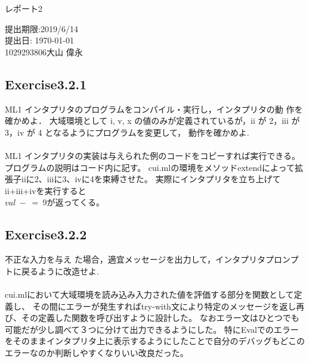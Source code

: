 \documentclass[a4paper,11pt,oneside,openany]{jsarticle}
\begin{document}
    \begin{center}
    
      \vspace*{35mm}
      \huge レポート2 \par
      \vspace{90mm}
      \Large 提出期限:2019/6/14\\
       提出日: \today \\
      \vspace{15mm}
      \Large 
       1029293806\hspace{5mm}大山 偉永\par
    
      \vspace{10mm}
    \end{center}
    \clearpage
    \addtocounter{page}{-1}
    
    \newpage

\subsection{Exercise3.2.1}
    ML1 インタプリタのプログラムをコンパイル・実行し，インタプリタの動 作を確かめよ．
    大域環境として i, v, x の値のみが定義されているが，ii が 2，iii が 3，iv が 4 となるようにプログラムを変更して，
    動作を確かめよ.\\\\
    ML1 インタプリタの実装は与えられた例のコードをコピーすれば実行できる。プログラムの説明はコード内に記す。
    cui.mlの環境をメソッドextendによって拡張子iiに2、iiiに3、ivに4を束縛させた。
    実際にインタプリタを立ち上げてii+iii+ivを実行すると\\
    $val\ -\ =\ 9$が返ってくる。

\subsection{Exercise3.2.2}
    不正な入力を与え た場合，適宜メッセージを出力して，インタプリタプロンプトに戻るように改造せよ.\\\\
    cui.mlにおいて大域環境を読み込み入力された値を評価する部分を関数として定義し、
    その間にエラーが発生すればtry-with文により特定のメッセージを返し再び、その定義した関数を呼び出すように設計した。
    なおエラー文はひとつでも可能だが少し調べて３つに分けて出力できるようにした。
    特にEvalでのエラーをそのままインタプリタ上に表示するようにしたことで自分のデバッグもどこのエラーなのか判断しやすくなりいい改良だった。
\end{document}
